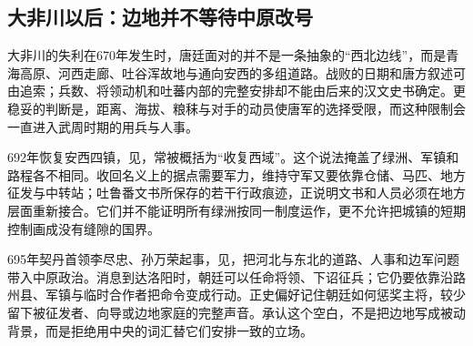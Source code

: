 \subsection{大非川以后：边地并不等待中原改号}
大非川的失利在670年发生时，唐廷面对的并不是一条抽象的“西北边线”，而是青海高原、河西走廊、吐谷浑故地与通向安西的多组道路。战败的日期和唐方叙述可由追索；兵数、将领动机和吐蕃内部的完整安排却不能由后来的汉文史书确定。更稳妥的判断是，距离、海拔、粮秣与对手的动员使唐军的选择受限，而这种限制会一直进入武周时期的用兵与人事。

692年恢复安西四镇，见，常被概括为“收复西域”。这个说法掩盖了绿洲、军镇和路程各不相同。收回名义上的据点需要军力，维持守军又要依靠仓储、马匹、地方征发与中转站；吐鲁番文书所保存的若干行政痕迹，正说明文书和人员必须在地方层面重新接合。它们并不能证明所有绿洲按同一制度运作，更不允许把城镇的短期控制画成没有缝隙的国界。

695年契丹首领李尽忠、孙万荣起事，见，把河北与东北的道路、人事和边军问题带入中原政治。消息到达洛阳时，朝廷可以任命将领、下诏征兵；它仍要依靠沿路州县、军镇与临时合作者把命令变成行动。正史偏好记住朝廷如何惩奖主将，较少留下被征发者、向导或边地家庭的完整声音。承认这个空白，不是把边地写成被动背景，而是拒绝用中央的词汇替它们安排一致的立场。





























